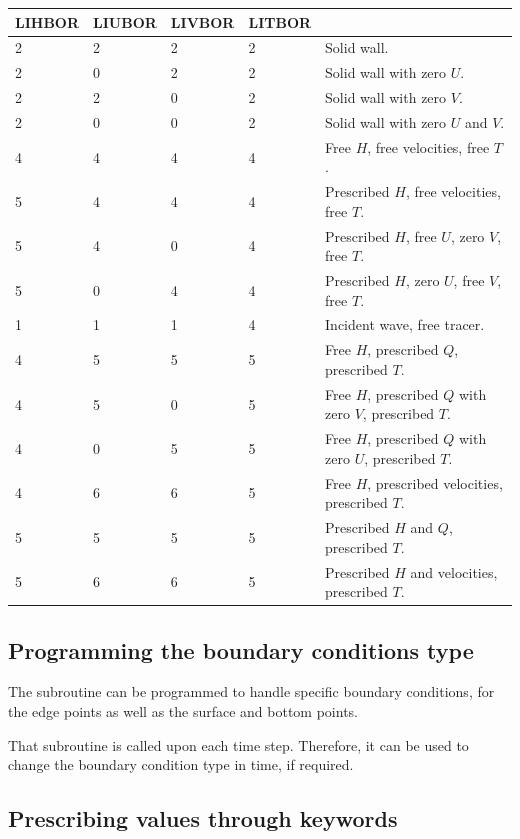 \begin{tabular}{|p{0.5in}|p{0.5in}|p{0.5in}|p{0.5in}|p{2.0in}|} \hline
LIHBOR & LIUBOR & LIVBOR & LITBOR &  \\ \hline
2 & 2 & 2 & 2 & Solid wall. \\ \hline
2 & 0 & 2 & 2 & Solid wall with zero $U$. \\ \hline
2 & 2 & 0 & 2 & Solid wall with zero $V$. \\ \hline
2 & 0 & 0 & 2 & Solid wall with zero $U$ and $V$. \\ \hline
4 & 4 & 4 & 4 & Free $H$, free velocities, free $T$. \\ \hline
5 & 4 & 4 & 4 & Prescribed $H$, free velocities, free $T$. \\ \hline
5 & 4 & 0 & 4 & Prescribed $H$, free $U$, zero $V$, free $T$. \\ \hline
5 & 0 & 4 & 4 & Prescribed $H$, zero $U$, free $V$, free $T$. \\ \hline
1 & 1 & 1 & 4 & Incident wave, free tracer. \\ \hline
4 & 5 & 5 & 5 & Free $H$, prescribed $Q$, prescribed $T$. \\ \hline
4 & 5 & 0 & 5 & Free $H$, prescribed $Q$ with zero $V$, prescribed $T$. \\ \hline
4 & 0 & 5 & 5 & Free $H$, prescribed $Q$ with zero $U$, prescribed $T$. \\ \hline
4 & 6 & 6 & 5 & Free $H$, prescribed velocities, prescribed $T$.
\\ \hline
5 & 5 & 5 & 5 & Prescribed $H$ and $Q$, prescribed $T$. \\ \hline
5 & 6 & 6 & 5 & Prescribed $H$ and velocities, prescribed $T$. \\
\hline
\end{tabular}


\subsection{Programming the boundary conditions type}

The  subroutine can be programmed to handle specific boundary
conditions, for the edge points as well as the surface and bottom points.

That subroutine is called upon each time step. Therefore, it can be used to
change the boundary condition type in time, if required.


\subsection{Prescribing values through keywords}

